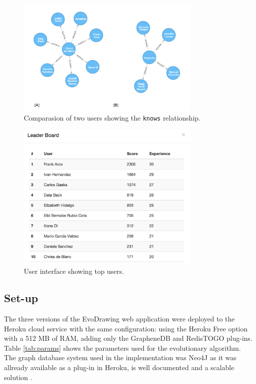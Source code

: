 \documentclass[conference]{IEEEtran}
\begin{document}
\begin{figure}[!t]
    \centering
        \includegraphics[width=3.5in]{img/users_known_1.png}
    \caption{Comparasion of two users showing the {\tt knows} relationship.}
    \label{fig:users-graph}
\end{figure}



\begin{figure}[!t]
    \centering
        \includegraphics[width=3.5in]{img/leaderBoard.png}
    \caption{User interface showing top users.}
    \label{fig:top-users}
\end{figure}



\subsection{Set-up}
\label{sec:setup}

The three versions of the EvoDrawing web application were deployed to the
Heroku cloud service with the same configuration: using the
Heroku Free option with a 512 MB of RAM, adding only the GrapheneDB and RedisTOGO plug-ins.
Table \ref{tab:params} shows the parameters used for the evolutionary algorithm. The graph database 
system used in the implementation was Neo4J as it was allready available as a plug-in in Heroku, is well documented
and a scalable solution \cite{miller2013graph,holzschuher2013performance}.  
\end{document}
